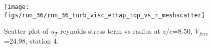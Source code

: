 \begin{figure}[H]
\centering
\texttt{[image: figs/run\_36/run\_36\_turb\_visc\_ettap\_top\_vs\_r\_meshscatter]}
\caption{Scatter plot of $
u_T$ reynolds stress term vs radius at $z/c$=8.50, $V_{free}$=24.98, station 4.}
\label{fig:run_36_turb_visc_ettap_top_vs_r_meshscatter}
\end{figure}


